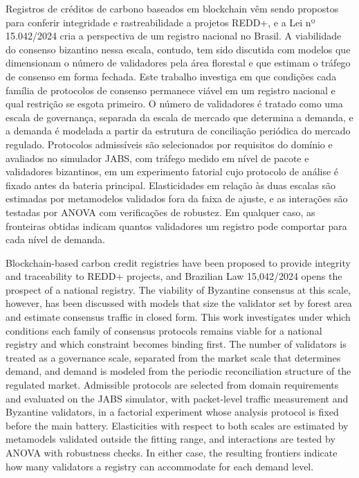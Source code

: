 \begin{abstract-pt}
Registros de créditos de carbono baseados em blockchain vêm sendo propostos para conferir integridade e rastreabilidade a projetos REDD+, e a Lei nº 15.042/2024 cria a perspectiva de um registro nacional no Brasil. A viabilidade do consenso bizantino nessa escala, contudo, tem sido discutida com modelos que dimensionam o número de validadores pela área florestal e que estimam o tráfego de consenso em forma fechada. Este trabalho investiga em que condições cada família de protocolos de consenso permanece viável em um registro nacional e qual restrição se esgota primeiro. O número de validadores é tratado como uma escala de governança, separada da escala de mercado que determina a demanda, e a demanda é modelada a partir da estrutura de conciliação periódica do mercado regulado. Protocolos admissíveis são selecionados por requisitos do domínio e avaliados no simulador JABS, com tráfego medido em nível de pacote e validadores bizantinos, em um experimento fatorial cujo protocolo de análise é fixado antes da bateria principal. Elasticidades em relação às duas escalas são estimadas por metamodelos validados fora da faixa de ajuste, e as interações são testadas por ANOVA com verificações de robustez.   Em qualquer caso, as fronteiras obtidas indicam quantos validadores um registro pode comportar para cada nível de demanda.
\end{abstract-pt}

\begin{abstract-en}
Blockchain-based carbon credit registries have been proposed to provide integrity and traceability to REDD+ projects, and Brazilian Law 15,042/2024 opens the prospect of a national registry. The viability of Byzantine consensus at this scale, however, has been discussed with models that size the validator set by forest area and estimate consensus traffic in closed form. This work investigates under which conditions each family of consensus protocols remains viable for a national registry and which constraint becomes binding first. The number of validators is treated as a governance scale, separated from the market scale that determines demand, and demand is modeled from the periodic reconciliation structure of the regulated market. Admissible protocols are selected from domain requirements and evaluated on the JABS simulator, with packet-level traffic measurement and Byzantine validators, in a factorial experiment whose analysis protocol is fixed before the main battery. Elasticities with respect to both scales are estimated by metamodels validated outside the fitting range, and interactions are tested by ANOVA with robustness checks.   In either case, the resulting frontiers indicate how many validators a registry can accommodate for each demand level.
\end{abstract-en}

